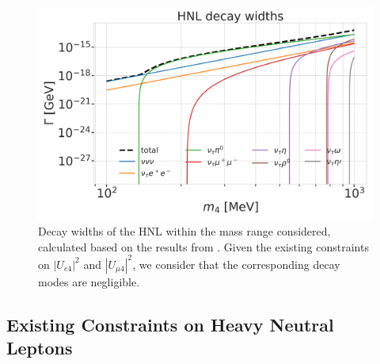 

\begin{figure}
    \includegraphics{figures/hnl_simulation/decay_theory/hnl_decay_widths_up_to_1.0_GeV_log.png}
    \caption[HNL decay widths]{Decay widths of the HNL within the mass range considered, calculated based on the results from \cite{Coloma:2020lgy}. Given the existing constraints on $|U_{e4}|^{2}$ and $|U_{\mu4}|^{2}$, we consider that the corresponding decay modes are negligible.}
\end{figure}


\subsection{Existing Constraints on Heavy Neutral Leptons} 



